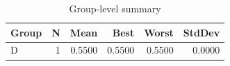 \begin{table}[htbp]
\centering
\caption{Group-level summary}
\label{tab:group-summary}
\begin{tabular}{lrrrrr}
\toprule
\textbf{Group} & \textbf{N} & \textbf{Mean} & \textbf{Best} & \textbf{Worst} & \textbf{StdDev} \\
\midrule
D & 1 & 0.5500 & 0.5500 & 0.5500 & 0.0000 \\
\bottomrule
\end{tabular}
\end{table}